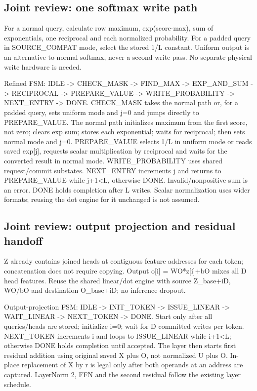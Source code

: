 \documentclass[11pt,a4paper]{article}
\begin{document}
\subsection{Joint review: one softmax write path}

For a normal query, calculate row maximum, exp(score-max), sum of exponentials, one reciprocal and each normalized probability. For a padded query in SOURCE\_COMPAT mode, select the stored 1/L constant. Uniform output is an alternative to normal softmax, never a second write pass. No separate physical write hardware is needed.

Refined FSM: IDLE -> CHECK\_MASK -> FIND\_MAX -> EXP\_AND\_SUM -> RECIPROCAL -> PREPARE\_VALUE -> WRITE\_PROBABILITY -> NEXT\_ENTRY -> DONE. CHECK\_MASK takes the normal path or, for a padded query, sets uniform mode and j=0 and jumps directly to PREPARE\_VALUE. The normal path initializes maximum from the first score, not zero; clears exp sum; stores each exponential; waits for reciprocal; then sets normal mode and j=0. PREPARE\_VALUE selects 1/L in uniform mode or reads saved exp[j], requests scalar multiplication by reciprocal and waits for the converted result in normal mode. WRITE\_PROBABILITY uses shared request/commit substates. NEXT\_ENTRY increments j and returns to PREPARE\_VALUE while j+1<L, otherwise DONE. Invalid/nonpositive sum is an error. DONE holds completion after L writes. Scalar normalization uses wider formats; reusing the dot engine for it unchanged is not assumed.

\subsection{Joint review: output projection and residual handoff}

Z already contains joined heads at contiguous feature addresses for each token; concatenation does not require copying. Output o[i] = WO*z[i]+bO mixes all D head features. Reuse the shared linear/dot engine with source Z\_base+iD, WO/bO and destination O\_base+iD; no inference dropout.

Output-projection FSM: IDLE -> INIT\_TOKEN -> ISSUE\_LINEAR -> WAIT\_LINEAR -> NEXT\_TOKEN -> DONE. Start only after all queries/heads are stored; initialize i=0; wait for D committed writes per token. NEXT\_TOKEN increments i and loops to ISSUE\_LINEAR while i+1<L; otherwise DONE holds completion until accepted. The layer then starts first residual addition using original saved X plus O, not normalized U plus O. In-place replacement of X by r is legal only after both operands at an address are captured. LayerNorm 2, FFN and the second residual follow the existing layer schedule.
\end{document}
